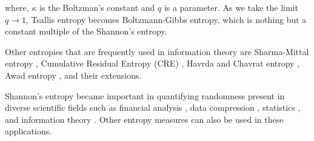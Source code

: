 \documentclass{article}
\begin{document}
where, $\kappa$ is the Boltzman's constant and $q$ is a parameter. As we take the limit $q\rightarrow 1$, Tsallis entropy becomes Boltzmann-Gibbs entropy, which is nothing but a constant multiple of the Shannon's entropy.
\par
Other entropies that are frequently used in information theory are Sharma-Mittal entropy \citep{sharma1975new}, Cumulative Residual Entropy (CRE) \citep{rao2004cumulative}, Havrda and Chavrat entropy \citep{havrda1967quantification}, Awad entropy \citep{awad1987application}, and their extensions.
\par
Shannon's entropy became important in quantifying randomness present in diverse scientific fields such as financial analysis \citep{sharpe1998investments}, data compression \citep{salomon2007concise}, statistics \citep{kullback1959statistics}, and information theory \citep{cover1991entropy}. Other entropy measures can also be used in these applications.
\end{document}
